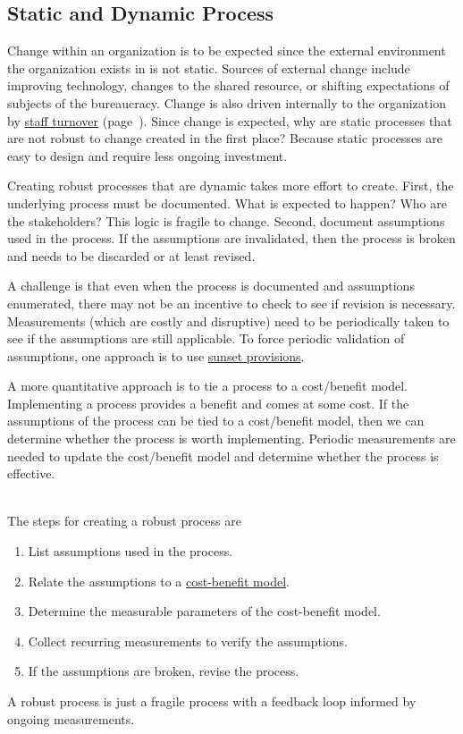 \subsection*{Static and Dynamic Process\label{sec:static-dynamic-processes}}


Change within an \gls{organization} is to be expected since the external environment the organization exists in is not static. Sources of external change include improving technology,  changes to the \gls{shared resource}, or shifting expectations of subjects of the bureaucracy.
Change is also driven internally to the organization by \hyperref[sec:turnover]{staff turnover} 
(page~\pageref{sec:turnover}).
Since change is expected, why are static processes that are not robust to change created in the first place? Because static processes are easy to design and require less ongoing investment.

Creating robust processes that are dynamic takes more effort to create. First, the underlying process must be documented. What is expected to happen? Who are the stakeholders? This logic is fragile to change. Second, document assumptions used in the process. If the assumptions are invalidated, then the process is broken and needs to be discarded or at least revised. 

A challenge is that even when the process is documented and assumptions enumerated, there may not be an incentive to check to see if revision is necessary. Measurements (which are costly and disruptive) need to be periodically taken to see if the assumptions are still applicable. To force periodic validation of assumptions, one approach is to use \href{https://en.wikipedia.org/wiki/Sunset_provision}{sunset provisions}. 

A more quantitative approach is to tie a process to a cost/benefit model. Implementing a process provides a benefit and comes at some cost. If the assumptions of the process can be tied to a cost/benefit model, then we can determine whether the process is worth implementing. Periodic measurements are needed to update the cost/benefit model and determine whether the process is effective.

\ \\

The steps for creating a robust process are
\begin{enumerate}
    \item List assumptions used in the process. 
    \item Relate the assumptions to a \href{https://en.wikipedia.org/wiki/Cost\%E2\%80\%93benefit_analysis}{cost-benefit model}.
    \item Determine the measurable parameters of the cost-benefit model. 
    \item Collect recurring measurements to verify the assumptions. 
    \item If the assumptions are broken, revise the process. 
\end{enumerate}
A robust process is just a fragile process with a feedback loop informed by ongoing measurements. 